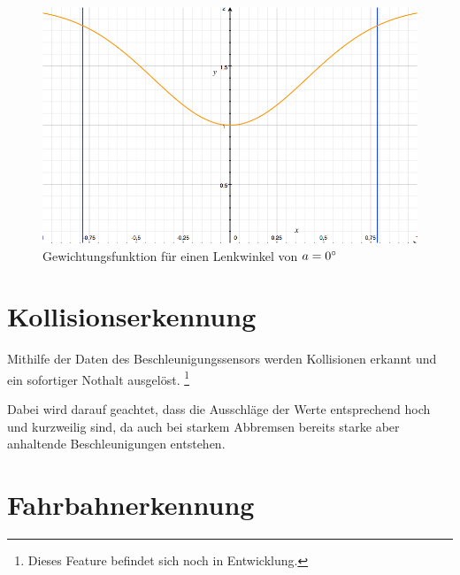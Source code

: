\documentclass[a4paper,12pt]{report}
\begin{document}
	
	\begin{figure}
		\centering
		\includegraphics[width=\textwidth,height=\textheight,keepaspectratio]{assets/uss-function}
		\caption{Gewichtungsfunktion für einen Lenkwinkel von $a = 0\degree$}
		\label{img_uss_function}
	\end{figure}
	

\chapter{Kollisionserkennung}

	Mithilfe der Daten des Beschleunigungssensors werden Kollisionen erkannt und ein sofortiger Nothalt ausgelöst.
	\footnote{Dieses Feature befindet sich noch in Entwicklung.}
	
	Dabei wird darauf geachtet, dass die Ausschläge der Werte entsprechend hoch und kurzweilig sind, da auch bei starkem Abbremsen bereits starke aber anhaltende Beschleunigungen entstehen.
	

\chapter{Fahrbahnerkennung}


\end{document}
